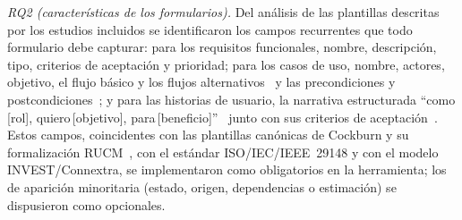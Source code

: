\documentclass[10pt,journal,twoside,letterpaper]{IEEEtran}
\begin{document}
	\textit{RQ2 (características de los formularios).} Del análisis de las plantillas descritas por los estudios incluidos se identificaron los campos recurrentes que todo formulario debe capturar: para los requisitos funcionales, nombre, descripción, tipo, criterios de aceptación y prioridad; para los casos de uso, nombre, actores, objetivo, el flujo básico y los flujos alternativos~\cite{p014,p015,p019,p028,p048,p057,p063,p066,p067,p076,p083,p088,p089,p090,p091,p092,p094,p095,p097,p098,p099} y las precondiciones y postcondiciones~\cite{p001,p008,p012,p013,p016,p017,p021,p025,p029,p030,p032,p042,p044,p048,p052,p054,p055,p056,p057,p058,p059,p063,p066,p070,p072,p074,p075,p076,p080,p082,p083,p085,p086,p088,p089,p090,p091,p094,p095,p096,p097,p098,p099,p101}; y para las historias de usuario, la narrativa estructurada ``como\,[rol], quiero\,[objetivo], para\,[beneficio]''~\cite{p001,p002,p005,p007,p010,p012,p013,p014,p016,p020,p021,p024,p026,p034,p035,p041,p044,p045,p050,p055,p062,p063,p066,p067,p070,p076,p080,p081,p086,p088,p100,p101,p102,p103,p104,p105,p106,p107,p108} junto con sus criterios de aceptación~\cite{p001,p007,p013,p016,p021,p024,p025,p035,p041,p042,p044,p050,p057,p067,p070,p076,p081,p088,p101,p104,p106,p107}. Estos campos, coincidentes con las plantillas canónicas de Cockburn y su formalización RUCM~\cite{p001,p017,p019,p020,p048,p050,p051,p057,p066,p070,p076,p083,p088,p089,p090,p091,p094,p095,p097,p098,p099,p105}, con el estándar ISO/IEC/IEEE~29148 y con el modelo INVEST/Connextra, se implementaron como obligatorios en la herramienta; los de aparición minoritaria (estado, origen, dependencias o estimación) se dispusieron como opcionales.
	
\end{document}

